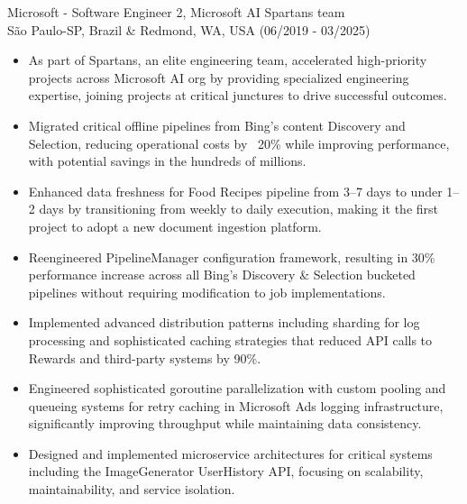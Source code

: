 
\normalsize{Microsoft - Software Engineer 2, Microsoft AI Spartans team}\\
        \scriptsize{São Paulo-SP, Brazil \& Redmond, WA, USA (06/2019 - 03/2025)}
\begin{itemize}
    \item \scriptsize{As part of Spartans, an elite engineering team, accelerated high-priority projects across Microsoft AI org by providing specialized engineering expertise, joining projects at critical junctures to drive successful outcomes.}
    
    \item \scriptsize{Migrated critical offline pipelines from Bing's content Discovery and Selection, reducing operational costs by ~20\% while improving performance, with potential savings in the hundreds of millions.}
    
    \item \scriptsize{Enhanced data freshness for Food Recipes pipeline from 3–7 days to under 1–2 days by transitioning from weekly to daily execution, making it the first project to adopt a new document ingestion platform.}
    
    \item \scriptsize{Reengineered PipelineManager configuration framework, resulting in 30\% performance increase across all Bing's Discovery \& Selection bucketed pipelines without requiring modification to job implementations.}
    
    \item \scriptsize{Implemented advanced distribution patterns including sharding for log processing and sophisticated caching strategies that reduced API calls to Rewards and third-party systems by 90\%.}
    
    \item \scriptsize{Engineered sophisticated goroutine parallelization with custom pooling and queueing systems for retry caching in Microsoft Ads logging infrastructure, significantly improving throughput while maintaining data consistency.}
    
    \item \scriptsize{Designed and implemented microservice architectures for critical systems including the ImageGenerator UserHistory API, focusing on scalability, maintainability, and service isolation.}
    

\end{itemize}
